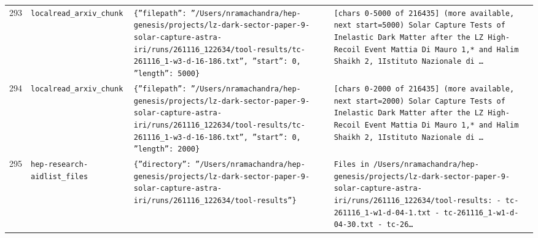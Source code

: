 \documentclass[11pt,a4paper]{article}
\begin{document}
\begin{longtable}{@{}p{}p{}p{}p{}@{}}
293 & \texttt{local}\newline\texttt{read\_\allowbreak{}arxiv\_\allowbreak{}chunk} & \texttt{\{''filepath'':\allowbreak{} ''/\allowbreak{}Users/\allowbreak{}nramachandra/\allowbreak{}hep-genesis/\allowbreak{}projects/\allowbreak{}lz-dark-sector-paper-9-solar-capture-astra-iri/\allowbreak{}runs/\allowbreak{}261116\_\allowbreak{}122634/\allowbreak{}tool-results/\allowbreak{}tc-261116\_\allowbreak{}1-w3-d-16-186.txt'',\allowbreak{} ''start'':\allowbreak{} 0,\allowbreak{} ''length'':\allowbreak{} 5000\}\allowbreak{}} & \texttt{[chars 0-5000 of 216435]\allowbreak{} (more available,\allowbreak{} next start=\allowbreak{}5000)\allowbreak{}  Solar Capture Tests of Inelastic Dark Matter after the LZ High-Recoil Event Mattia Di Mauro 1,\allowbreak{}* and Halim Shaikh 2,\allowbreak{}\dag{}\allowbreak{} 1Istituto Nazionale di \ldots{}\allowbreak{}} \\
294 & \texttt{local}\newline\texttt{read\_\allowbreak{}arxiv\_\allowbreak{}chunk} & \texttt{\{''filepath'':\allowbreak{} ''/\allowbreak{}Users/\allowbreak{}nramachandra/\allowbreak{}hep-genesis/\allowbreak{}projects/\allowbreak{}lz-dark-sector-paper-9-solar-capture-astra-iri/\allowbreak{}runs/\allowbreak{}261116\_\allowbreak{}122634/\allowbreak{}tool-results/\allowbreak{}tc-261116\_\allowbreak{}1-w3-d-16-186.txt'',\allowbreak{} ''start'':\allowbreak{} 0,\allowbreak{} ''length'':\allowbreak{} 2000\}\allowbreak{}} & \texttt{[chars 0-2000 of 216435]\allowbreak{} (more available,\allowbreak{} next start=\allowbreak{}2000)\allowbreak{}  Solar Capture Tests of Inelastic Dark Matter after the LZ High-Recoil Event Mattia Di Mauro 1,\allowbreak{}* and Halim Shaikh 2,\allowbreak{}\dag{}\allowbreak{} 1Istituto Nazionale di \ldots{}\allowbreak{}} \\
295 & \texttt{hep-research-aid}\newline\texttt{list\_\allowbreak{}files} & \texttt{\{''directory'':\allowbreak{} ''/\allowbreak{}Users/\allowbreak{}nramachandra/\allowbreak{}hep-genesis/\allowbreak{}projects/\allowbreak{}lz-dark-sector-paper-9-solar-capture-astra-iri/\allowbreak{}runs/\allowbreak{}261116\_\allowbreak{}122634/\allowbreak{}tool-results''\}\allowbreak{}} & \texttt{Files in /\allowbreak{}Users/\allowbreak{}nramachandra/\allowbreak{}hep-genesis/\allowbreak{}projects/\allowbreak{}lz-dark-sector-paper-9-solar-capture-astra-iri/\allowbreak{}runs/\allowbreak{}261116\_\allowbreak{}122634/\allowbreak{}tool-results:\allowbreak{}   - tc-261116\_\allowbreak{}1-w1-d-04-1.txt   - tc-261116\_\allowbreak{}1-w1-d-04-30.txt   - tc-26\ldots{}\allowbreak{}} \\

\end{longtable}
\end{document}
